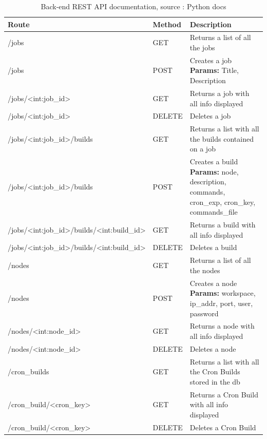 \documentclass{article}
\begin{document}
\begin{table}[H]
\centering
\begin{tabular}{|m{7cm}|m{1.6cm}|p{5cm}|}
\hline
\textbf{Route} & \textbf{Method} & \textbf{Description} \\ \hline
/jobs           & GET            & Returns a list of all the jobs    \\ \hline
/jobs           & POST            & Creates a job \newline \textbf{Params:} Title, Description    \\ \hline
/jobs/<int:job\_id>  & GET            & Returns a job with all info displayed  \\ \hline
/jobs/<int:job\_id>   & DELETE            &  Deletes a job    \\ \hline
/jobs/<int:job\_id>/builds    & GET            & Returns a list with all the builds contained on a job     \\ \hline
/jobs/<int:job\_id>/builds    & POST            &  Creates a build \newline \textbf{Params:} node, description, commands, cron\_exp, cron\_key, commands\_file \\ \hline
/jobs/<int:job\_id>/builds/<int:build\_id>           & GET            & Returns a build with all info displayed    \\ \hline
/jobs/<int:job\_id>/builds/<int:build\_id>           & DELETE            &  Deletes a build   \\ \hline
/nodes          & GET            &  Returns a list of all the nodes   \\ \hline
/nodes          & POST            & Creates a node \newline \textbf{Params:} workspace, ip\_addr, port, user, password    \\ \hline
/nodes/<int:node\_id>          & GET            &  Returns a node with all info displayed    \\ \hline
/nodes/<int:node\_id>          & DELETE            & Deletes a node     \\ \hline
/cron\_builds          & GET            &  Returns a list with all the Cron Builds stored in the db  \\ \hline
/cron\_build/<cron\_key>          & GET            &  Returns a Cron Build with all info displayed   \\ \hline
/cron\_build/<cron\_key>          & DELETE            & Deletes a Cron Build    \\ \hline

\end{tabular}
\caption{Back-end REST API documentation, source : Python docs}
\end{table}
\newpage
\end{document}
